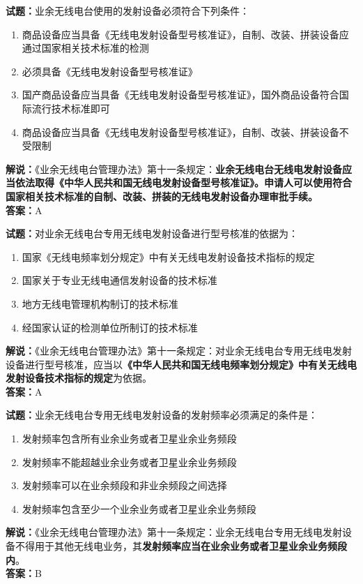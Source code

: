 \documentclass{ctexbook}
\begin{document}
\vspace{1em}

\textbf{试题：}业余无线电台使用的发射设备必须符合下列条件：
\begin{enumerate}[leftmargin=3em]
  \item 商品设备应当具备《无线电发射设备型号核准证》，自制、改装、拼装设备应通过国家相关技术标准的检测
  \item 必须具备《无线电发射设备型号核准证》
  \item 国产商品设备应当具备《无线电发射设备型号核准证》，国外商品设备符合国际流行技术标准即可
  \item 商品设备应当具备《无线电发射设备型号核准证》，自制、改装、拼装设备不受限制
\end{enumerate}
\noindent\textbf{解说：}《业余无线电台管理办法》第十一条规定：\textbf{业余无线电台无线电发射设备应当依法取得《中华人民共和国无线电发射设备型号核准证》。申请人可以使用符合国家相关技术标准的自制、改装、拼装的无线电发射设备办理审批手续。}\\\noindent\textbf{答案：}A

\vspace{1em}

\textbf{试题：}对业余无线电台专用无线电发射设备进行型号核准的依据为：
\begin{enumerate}[leftmargin=3em]
  \item 国家《无线电频率划分规定》中有关无线电发射设备技术指标的规定
  \item 国家关于专业无线电通信发射设备的技术标准
  \item 地方无线电管理机构制订的技术标准
  \item 经国家认证的检测单位所制订的技术标准
\end{enumerate}
\noindent\textbf{解说：}《业余无线电台管理办法》第十一条规定：对业余无线电台专用无线电发射设备进行型号核准，应当以\textbf{《中华人民共和国无线电频率划分规定》中有关无线电发射设备技术指标的规定}为依据。\\\noindent\textbf{答案：}A

\vspace{1em}

\textbf{试题：}业余无线电台专用无线电发射设备的发射频率必须满足的条件是：
\begin{enumerate}[leftmargin=3em]
  \item 发射频率包含所有业余业务或者卫星业余业务频段
  \item 发射频率不能超越业余业务或者卫星业余业务频段
  \item 发射频率可以在业余频段和非业余频段之间选择
  \item 发射频率包含至少一个业余业务或者卫星业余业务频段
\end{enumerate}
\noindent\textbf{解说：}《业余无线电台管理办法》第十一条规定：业余无线电台专用无线电发射设备不得用于其他无线电业务，其\textbf{发射频率应当在业余业务或者卫星业余业务频段内}。\\\noindent\textbf{答案：}B
\end{document}
